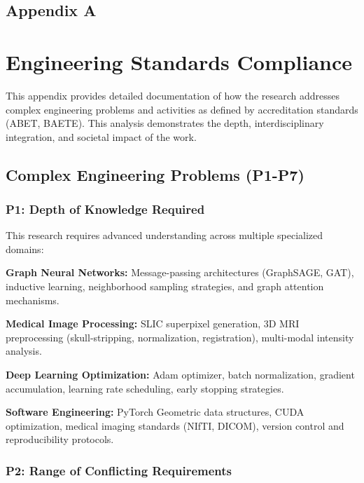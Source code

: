 \begin{center}
    \section*{\fontsize{20}{20}\selectfont Appendix A}
\end{center}
\vspace{10mm}

\section*{Engineering Standards Compliance}

This appendix provides detailed documentation of how the research addresses complex engineering problems and activities as defined by accreditation standards (ABET, BAETE). This analysis demonstrates the depth, interdisciplinary integration, and societal impact of the work.

\subsection*{Complex Engineering Problems (P1-P7)}

\subsubsection*{P1: Depth of Knowledge Required}

This research requires advanced understanding across multiple specialized domains:

\textbf{Graph Neural Networks:} Message-passing architectures (GraphSAGE, GAT), inductive learning, neighborhood sampling strategies, and graph attention mechanisms.

\textbf{Medical Image Processing:} SLIC superpixel generation, 3D MRI preprocessing (skull-stripping, normalization, registration), multi-modal intensity analysis.

\textbf{Deep Learning Optimization:} Adam optimizer, batch normalization, gradient accumulation, learning rate scheduling, early stopping strategies.

\textbf{Software Engineering:} PyTorch Geometric data structures, CUDA optimization, medical imaging standards (NIfTI, DICOM), version control and reproducibility protocols.

\subsubsection*{P2: Range of Conflicting Requirements}


